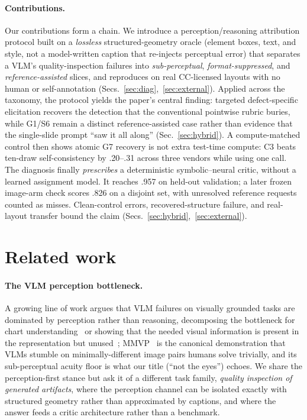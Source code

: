 \documentclass[10pt]{article}
\newcommand{\g}[1]{\textsf{#1}}        %
\begin{document}
\paragraph{Contributions.}
Our contributions form a chain. We introduce a perception/reasoning attribution protocol built on a
\emph{lossless} structured-geometry oracle (element boxes, text, and style, not a model-written caption that
re-injects perceptual error) that separates a VLM's quality-inspection failures into \emph{sub-perceptual},
\emph{format-suppressed}, and \emph{reference-assisted} slices, and reproduces on real CC-licensed layouts with
no human or self-annotation (Secs.~\ref{sec:diag},~\ref{sec:external}). Applied across the taxonomy, the
protocol yields the paper's central finding: targeted defect-specific elicitation recovers the detection that
the conventional pointwise rubric buries, while \g{G1}/\g{S6} remain a distinct reference-assisted case rather
than evidence that the single-slide prompt ``saw it all along'' (Sec.~\ref{sec:hybrid}). A compute-matched
control then shows atomic \g{G7} recovery is not extra test-time compute: C3 beats ten-draw self-consistency by
.20--.31 across three vendors while using one call. The diagnosis finally \emph{prescribes} a deterministic
symbolic--neural critic, without a learned assignment model. It reaches .957 on held-out validation; a later
frozen image-arm check scores .826 on a disjoint set, with unresolved reference requests counted as misses.
Clean-control errors, recovered-structure failure, and real-layout
transfer bound the claim (Secs.~\ref{sec:hybrid},~\ref{sec:external}).

\section{Related work}

\paragraph{The VLM perception bottleneck.}
A growing line of work argues that VLM failures on visually grounded tasks are dominated by perception rather
than reasoning, decomposing the bottleneck for chart understanding~\cite{chartbottleneck} or showing that
the needed visual information is present in the representation but unused~\cite{hiddeninplainsight}; \textsc{MMVP}~\cite{mmvp}
is the canonical demonstration that VLMs stumble on minimally-different image pairs humans solve trivially, and
its sub-perceptual acuity floor is what our title (``not the eyes'') echoes. We share
the perception-first stance but ask it of a different task family, \emph{quality inspection of generated
artifacts}, where the perception channel can be isolated exactly with structured geometry rather than
approximated by captions, and where the answer feeds a critic architecture rather than a benchmark.
\end{document}

